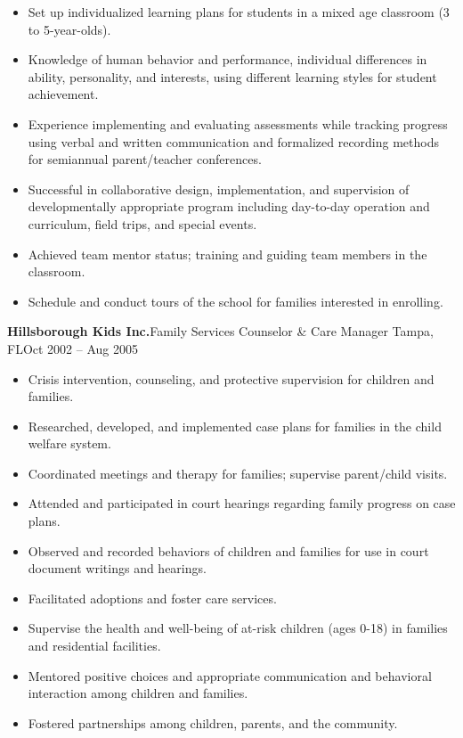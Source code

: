 \documentclass[letterpaper,10pt]{article}
\begin{document}
\begin{itemize}
    \item Set up individualized learning plans for students in a mixed age classroom (3 to 5-year-olds).
    \item Knowledge of human behavior and performance, individual differences in ability, personality, and
    interests, using different learning styles for student achievement.
    \item Experience implementing and evaluating assessments while tracking progress using verbal and
    written communication and formalized recording methods for semiannual parent/teacher conferences.
    \item Successful in collaborative design, implementation, and supervision of developmentally appropriate
    program including day-to-day operation and curriculum, field trips, and special events.
    \item Achieved team mentor status; training and guiding team members in the classroom.
    \item Schedule and conduct tours of the school for families interested in enrolling.
\end{itemize}

\vspace{1pc}
\textbf{Hillsborough Kids Inc.}\hfill Family Services Counselor \& Care Manager
\smallbreak Tampa, FL\hfill Oct 2002 -- Aug 2005

\begin{itemize}
    \item Crisis intervention, counseling, and protective supervision for children and families.
    \item Researched, developed, and implemented case plans for families in the child welfare system.
    \item Coordinated meetings and therapy for families; supervise parent/child visits.
    \item Attended and participated in court hearings regarding family progress on case plans.
    \item Observed and recorded behaviors of children and families for use in court document writings and hearings.
    \item Facilitated adoptions and foster care services.
    \item Supervise the health and well-being of at-risk children (ages 0-18) in families and residential facilities.
    \item Mentored positive choices and appropriate communication and behavioral interaction among children and families.
    \item Fostered partnerships among children, parents, and the community.
\end{itemize}
\end{document}

